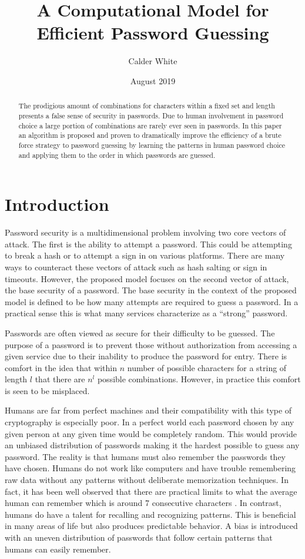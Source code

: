 \documentclass[11pt]{article}
\title{A Computational Model for Efficient Password Guessing}
\author{Calder White}
\date{August 2019}
\begin{document}
\maketitle

\begin{abstract}
    The prodigious amount of combinations for characters within a fixed set and length presents a false sense of security in passwords. Due to human involvement in password choice a large portion of combinations are rarely ever seen in passwords. In this paper an algorithm is proposed and proven to dramatically improve the efficiency of a brute force strategy to password guessing by learning the patterns in human password choice and applying them to the order in which passwords are guessed.
\end{abstract}


\section{Introduction} \label{introduction_sec}

Password security is a multidimensional problem involving two core vectors of attack. The first is the ability to attempt a password. This could be attempting to break a hash or to attempt a sign in on various platforms. There are many ways to counteract these vectors of attack such as hash salting or sign in timeouts. However, the proposed model focuses on the second vector of attack, the base security of a password. The base security in the context of the proposed model is defined to be how many attempts are required to guess a password. In a practical sense this is what many services characterize as a “strong” password.

Passwords are often viewed as secure for their difficulty to be guessed. The purpose of a password is to prevent those without authorization from accessing a given service due to their inability to produce the password for entry. There is comfort in the idea that within $n$ number of possible characters for a string of length $l$ that there are $n^l$ possible combinations. However, in practice this comfort is seen to be misplaced.

Humans are far from perfect machines and their compatibility with this type of cryptography is especially poor. In a perfect world each password chosen by any given person at any given time would be completely random. This would provide an unbiased distribution of passwords making it the hardest possible to guess any password. The reality is that humans must also remember the passwords they have chosen. Humans do not work like computers and have trouble remembering raw data without any patterns without deliberate memorization techniques. In fact, it has been well observed that there are practical limits to what the average human can remember which is around 7 consecutive characters \cite{miller1956magical}. In contrast, humans do have a talent for recalling and recognizing patterns. This is beneficial in many areas of life but also produces predictable behavior. A bias is introduced with an uneven distribution of passwords that follow certain patterns that humans can easily remember.
\end{document}

